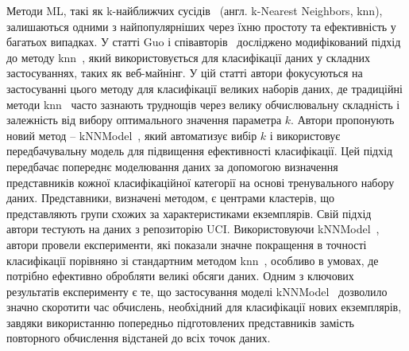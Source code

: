 Методи ML, такі як k-найближчих сусідів~\cite{ct4} (англ. k-Nearest Neighbors, knn), залишаються одними з найпопулярніших через їхню простоту та ефективність у багатьох випадках. У статті Guo і співавторів~\cite{ct13} досліджено модифікований підхід до методу knn~\cite{ct4}, який використовується для класифікації даних у складних застосуваннях, таких як веб-майнінг. У цій статті автори фокусуються на застосуванні цього методу для класифікації великих наборів даних, де традиційні методи knn~\cite{ct4} часто зазнають труднощів через велику обчислювальну складність і залежність від вибору оптимального значення параметра \( k \). Автори пропонують новий метод -- kNNModel~\cite{ct13}, який автоматизує вибір \( k \) і використовує передбачувальну модель для підвищення ефективності класифікації. Цей підхід передбачає попереднє моделювання даних за допомогою визначення представників кожної класифікаційної категорії на основі тренувального набору даних. Представники, визначені методом, є центрами кластерів, що представляють групи схожих за характеристиками екземплярів. Свій підхід автори тестують на даних з репозиторію UCI. Використовуючи kNNModel~\cite{ct13}, автори провели експерименти, які показали значне покращення в точності класифікації порівняно зі стандартним методом knn~\cite{ct4}, особливо в умовах, де потрібно ефективно обробляти великі обсяги даних. Одним з ключових результатів експерименту є те, що застосування моделі kNNModel~\cite{ct13} дозволило значно скоротити час обчислень, необхідний для класифікації нових екземплярів, завдяки використанню попередньо підготовлених представників замість повторного обчислення відстаней до всіх точок даних.

